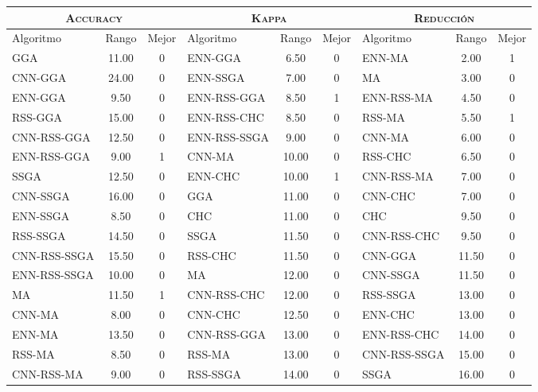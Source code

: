 \begin{table}[]
\centering
\begin{adjustbox}{max width =\textwidth}
\begin{tabular}{l c c|l c c|l c c}
\hline
\multicolumn{3}{c|}{\textsc{Accuracy}}
	& \multicolumn{3}{c|}{\textsc{Kappa}}
	& \multicolumn{3}{c}{\textsc{Reducción}} \\
\hline
Algoritmo & Rango & Mejor & Algoritmo & Rango & Mejor & Algoritmo & Rango & Mejor \\
\hline
\hline

GGA          & 11.00 & 0 & ENN-GGA      & 6.50  & 0 & ENN-MA       & 2.00  & 1 \\
CNN-GGA      & 24.00 & 0 & ENN-SSGA     & 7.00  & 0 & MA           & 3.00  & 0 \\
ENN-GGA      & 9.50  & 0 & ENN-RSS-GGA  & 8.50  & 1 & ENN-RSS-MA   & 4.50  & 0 \\
RSS-GGA      & 15.00 & 0 & ENN-RSS-CHC  & 8.50  & 0 & RSS-MA       & 5.50  & 1 \\
CNN-RSS-GGA  & 12.50 & 0 & ENN-RSS-SSGA & 9.00  & 0 & CNN-MA       & 6.00  & 0 \\
ENN-RSS-GGA  & 9.00  & 1 & CNN-MA       & 10.00 & 0 & RSS-CHC      & 6.50  & 0 \\
SSGA         & 12.50 & 0 & ENN-CHC      & 10.00 & 1 & CNN-RSS-MA   & 7.00  & 0 \\
CNN-SSGA     & 16.00 & 0 & GGA          & 11.00 & 0 & CNN-CHC      & 7.00  & 0 \\
ENN-SSGA     & 8.50  & 0 & CHC          & 11.00 & 0 & CHC          & 9.50  & 0 \\
RSS-SSGA     & 14.50 & 0 & SSGA         & 11.50 & 0 & CNN-RSS-CHC  & 9.50  & 0 \\
CNN-RSS-SSGA & 15.50 & 0 & RSS-CHC      & 11.50 & 0 & CNN-GGA      & 11.50 & 0 \\
ENN-RSS-SSGA & 10.00 & 0 & MA           & 12.00 & 0 & CNN-SSGA     & 11.50 & 0 \\
MA           & 11.50 & 1 & CNN-RSS-CHC  & 12.00 & 0 & RSS-SSGA     & 13.00 & 0 \\
CNN-MA       & 8.00  & 0 & CNN-CHC      & 12.50 & 0 & ENN-CHC      & 13.00 & 0 \\
ENN-MA       & 13.50 & 0 & CNN-RSS-GGA  & 13.00 & 0 & ENN-RSS-CHC  & 14.00 & 0 \\
RSS-MA       & 8.50  & 0 & RSS-MA       & 13.00 & 0 & CNN-RSS-SSGA & 15.00 & 0 \\
CNN-RSS-MA   & 9.00  & 0 & RSS-SSGA     & 14.00 & 0 & SSGA         & 16.00 & 0 \\

\end{tabular}
\end{adjustbox}
\end{table}
